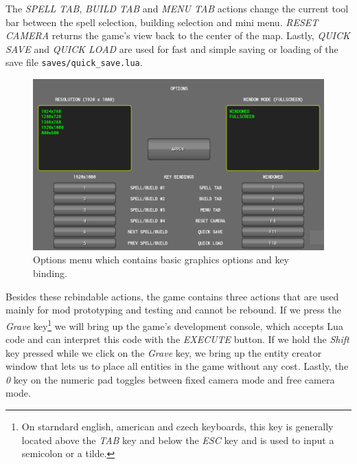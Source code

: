 The \emph{SPELL TAB}, \emph{BUILD TAB} and \emph{MENU TAB} actions change the current tool bar between the spell selection, building
selection and mini menu. \emph{RESET CAMERA} returns the game's view back to the center of the map. Lastly, \emph{QUICK SAVE} and
\emph{QUICK LOAD} are used for fast and simple saving or loading of the save file \texttt{saves/quick\_save.lua}.

\begin{figure}[H]
    \centering
    \includegraphics[width=\textwidth]{../img/gui-options.png}
    \caption{Options menu which contains basic graphics options and key binding.}
    \label{gui-options}
\end{figure}

Besides these rebindable actions, the game contains three actions that are used mainly for mod prototyping and testing and cannot be rebound.
If we press the \emph{Grave} key\footnote{On starndard english, american and czech keyboards, this key is generally located above the
\emph{TAB} key and below the \emph{ESC} key and is used to input a semicolon or a tilde.} we will bring up the game's development console,
which accepts Lua code and can interpret this code with the \emph{EXECUTE} button. If we hold the \emph{Shift} key pressed while we click
on the \emph{Grave} key, we bring up the entity creator window that lets us to place all entities in the game without any cost. Lastly,
the \emph{0} key on the numeric pad toggles between fixed camera mode and free camera mode.
